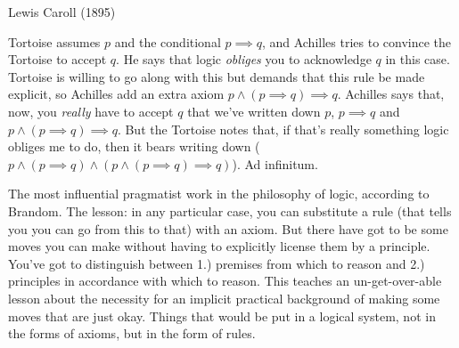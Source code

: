 
Lewis Caroll (1895)

Tortoise assumes $p$ and the conditional $p \implies q$, and Achilles tries to convince the Tortoise to accept $q$. He says that logic \emph{obliges} you to acknowledge $q$ in this case. Tortoise is willing to go along with this but demands that this rule be made explicit, so Achilles add an extra axiom $p \land (p \implies q) \implies q$. Achilles says that, now, you \emph{really} have to accept $q$ that we've written down $p$, $p \implies q$ and $p \land (p \implies q) \implies q$. But the Tortoise notes that, if that's really something logic obliges me to do, then it bears writing down ($p \land (p \implies q) \land (p \land (p \implies q) \implies q)$). Ad infinitum.

The most influential pragmatist work in the philosophy of logic, according to Brandom. The lesson: in any particular case, you can substitute a rule (that tells you you can go from this to that) with an axiom. But there have got to be some moves you can make without having to explicitly license them by a principle.  You've got to distinguish between 1.) premises from which to reason and 2.) principles in accordance with which to reason. This teaches an un-get-over-able lesson about the necessity for an implicit practical background of making some moves that are just okay. Things that would be put in a logical system, not in the forms of axioms, but in the form of rules.